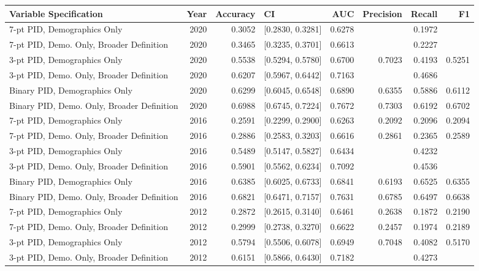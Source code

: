 \begin{longtable}{lrrlrrrr}
  \toprule
Variable Specification & Year & Accuracy & CI & AUC & Precision & Recall & F1 \\ 
  \midrule
7-pt PID, Demographics Only & 2020 & 0.3052 & [0.2830, 0.3281] & 0.6278 &  & 0.1972 &  \\ 
  7-pt PID, Demo. Only, Broader Definition & 2020 & 0.3465 & [0.3235, 0.3701] & 0.6613 &  & 0.2227 &  \\ 
  3-pt PID, Demographics Only & 2020 & 0.5538 & [0.5294, 0.5780] & 0.6700 & 0.7023 & 0.4193 & 0.5251 \\ 
  3-pt PID, Demo. Only, Broader Definition & 2020 & 0.6207 & [0.5967, 0.6442] & 0.7163 &  & 0.4686 &  \\ 
  Binary PID, Demographics Only & 2020 & 0.6299 & [0.6045, 0.6548] & 0.6890 & 0.6355 & 0.5886 & 0.6112 \\ 
  Binary PID, Demo. Only, Broader Definition & 2020 & 0.6988 & [0.6745, 0.7224] & 0.7672 & 0.7303 & 0.6192 & 0.6702 \\ 
  7-pt PID, Demographics Only & 2016 & 0.2591 & [0.2299, 0.2900] & 0.6263 & 0.2092 & 0.2096 & 0.2094 \\ 
  7-pt PID, Demo. Only, Broader Definition & 2016 & 0.2886 & [0.2583, 0.3203] & 0.6616 & 0.2861 & 0.2365 & 0.2589 \\ 
  3-pt PID, Demographics Only & 2016 & 0.5489 & [0.5147, 0.5827] & 0.6434 &  & 0.4232 &  \\ 
  3-pt PID, Demo. Only, Broader Definition & 2016 & 0.5901 & [0.5562, 0.6234] & 0.7092 &  & 0.4536 &  \\ 
  Binary PID, Demographics Only & 2016 & 0.6385 & [0.6025, 0.6733] & 0.6841 & 0.6193 & 0.6525 & 0.6355 \\ 
  Binary PID, Demo. Only, Broader Definition & 2016 & 0.6821 & [0.6471, 0.7157] & 0.7631 & 0.6785 & 0.6497 & 0.6638 \\ 
  7-pt PID, Demographics Only & 2012 & 0.2872 & [0.2615, 0.3140] & 0.6461 & 0.2638 & 0.1872 & 0.2190 \\ 
  7-pt PID, Demo. Only, Broader Definition & 2012 & 0.2999 & [0.2738, 0.3270] & 0.6622 & 0.2457 & 0.1974 & 0.2189 \\ 
  3-pt PID, Demographics Only & 2012 & 0.5794 & [0.5506, 0.6078] & 0.6949 & 0.7048 & 0.4082 & 0.5170 \\ 
  3-pt PID, Demo. Only, Broader Definition & 2012 & 0.6151 & [0.5866, 0.6430] & 0.7182 &  & 0.4273 &  \\ 

\end{longtable}
